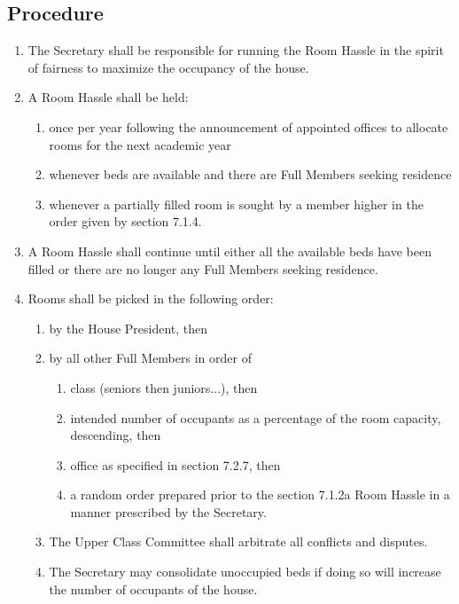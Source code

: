 \documentclass[10pt]{article} %
\begin{document}
\subsection{Procedure}
\begin{enumerate}
\item The Secretary shall be responsible for running the Room Hassle in the spirit of fairness to maximize the occupancy of the house.
\item A Room Hassle shall be held:
\begin{enumerate}
\item once per year following the announcement of appointed offices to allocate rooms for the next academic year
\item whenever beds are available and there are Full Members seeking residence
\item whenever a partially filled room is sought by a member higher in the order given by section 7.1.4.
\end{enumerate}
\item A Room Hassle shall continue until either all the available beds have been filled or there are no longer any Full Members seeking residence.
\item Rooms shall be picked in the following order:
\begin{enumerate}
\item by the House President, then
\item by all other Full Members in order of
\begin{enumerate}
\item class (seniors then juniors...), then
\item intended number of occupants as a percentage of the room capacity, descending, then
\item office as specified in section 7.2.7, then
\item a random order prepared prior to the section 7.1.2a Room Hassle in a manner prescribed by
the Secretary.
\end{enumerate}
\item The Upper Class Committee shall arbitrate all conflicts and disputes.
\item The Secretary may consolidate unoccupied beds if doing so will increase the number of occupants of the house.
\end{enumerate}
\end{enumerate}
\end{document}
